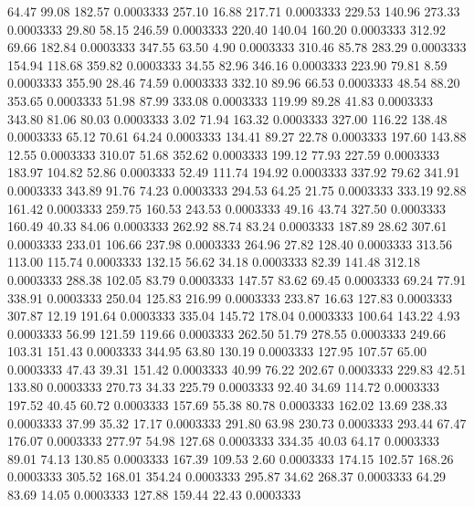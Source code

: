   64.47   99.08  182.57   0.0003333
 257.10   16.88  217.71   0.0003333
 229.53  140.96  273.33   0.0003333
  29.80   58.15  246.59   0.0003333
 220.40  140.04  160.20   0.0003333
 312.92   69.66  182.84   0.0003333
 347.55   63.50    4.90   0.0003333
 310.46   85.78  283.29   0.0003333
 154.94  118.68  359.82   0.0003333
  34.55   82.96  346.16   0.0003333
 223.90   79.81    8.59   0.0003333
 355.90   28.46   74.59   0.0003333
 332.10   89.96   66.53   0.0003333
  48.54   88.20  353.65   0.0003333
  51.98   87.99  333.08   0.0003333
 119.99   89.28   41.83   0.0003333
 343.80   81.06   80.03   0.0003333
   3.02   71.94  163.32   0.0003333
 327.00  116.22  138.48   0.0003333
  65.12   70.61   64.24   0.0003333
 134.41   89.27   22.78   0.0003333
 197.60  143.88   12.55   0.0003333
 310.07   51.68  352.62   0.0003333
 199.12   77.93  227.59   0.0003333
 183.97  104.82   52.86   0.0003333
  52.49  111.74  194.92   0.0003333
 337.92   79.62  341.91   0.0003333
 343.89   91.76   74.23   0.0003333
 294.53   64.25   21.75   0.0003333
 333.19   92.88  161.42   0.0003333
 259.75  160.53  243.53   0.0003333
  49.16   43.74  327.50   0.0003333
 160.49   40.33   84.06   0.0003333
 262.92   88.74   83.24   0.0003333
 187.89   28.62  307.61   0.0003333
 233.01  106.66  237.98   0.0003333
 264.96   27.82  128.40   0.0003333
 313.56  113.00  115.74   0.0003333
 132.15   56.62   34.18   0.0003333
  82.39  141.48  312.18   0.0003333
 288.38  102.05   83.79   0.0003333
 147.57   83.62   69.45   0.0003333
  69.24   77.91  338.91   0.0003333
 250.04  125.83  216.99   0.0003333
 233.87   16.63  127.83   0.0003333
 307.87   12.19  191.64   0.0003333
 335.04  145.72  178.04   0.0003333
 100.64  143.22    4.93   0.0003333
  56.99  121.59  119.66   0.0003333
 262.50   51.79  278.55   0.0003333
 249.66  103.31  151.43   0.0003333
 344.95   63.80  130.19   0.0003333
 127.95  107.57   65.00   0.0003333
  47.43   39.31  151.42   0.0003333
  40.99   76.22  202.67   0.0003333
 229.83   42.51  133.80   0.0003333
 270.73   34.33  225.79   0.0003333
  92.40   34.69  114.72   0.0003333
 197.52   40.45   60.72   0.0003333
 157.69   55.38   80.78   0.0003333
 162.02   13.69  238.33   0.0003333
  37.99   35.32   17.17   0.0003333
 291.80   63.98  230.73   0.0003333
 293.44   67.47  176.07   0.0003333
 277.97   54.98  127.68   0.0003333
 334.35   40.03   64.17   0.0003333
  89.01   74.13  130.85   0.0003333
 167.39  109.53    2.60   0.0003333
 174.15  102.57  168.26   0.0003333
 305.52  168.01  354.24   0.0003333
 295.87   34.62  268.37   0.0003333
  64.29   83.69   14.05   0.0003333
 127.88  159.44   22.43   0.0003333
